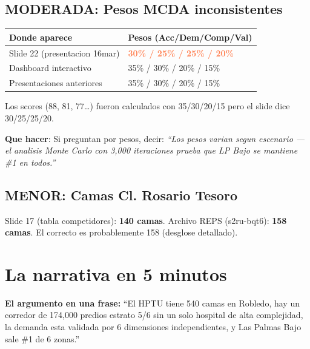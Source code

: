 \documentclass[11pt, a4paper]{article}
\newcommand{\dg}[1]{\textcolor{coral}{\textbf{#1}}}
\begin{document}
\subsection{MODERADA: Pesos MCDA inconsistentes}

\begin{aviso}
\begin{tabular}{@{}ll@{}}
\toprule
\textbf{Donde aparece} & \textbf{Pesos (Acc/Dem/Comp/Val)} \\
\midrule
Slide 22 (presentacion 16mar) & \dg{30\% / 25\% / 25\% / 20\%} \\
Dashboard interactivo & 35\% / 30\% / 20\% / 15\% \\
Presentaciones anteriores & 35\% / 30\% / 20\% / 15\% \\
\bottomrule
\end{tabular}

\vspace{4pt}
Los scores (88, 81, 77\ldots) fueron calculados con 35/30/20/15 pero el slide dice 30/25/25/20.

\vspace{2pt}
\textbf{Que hacer}: Si preguntan por pesos, decir: \textit{``Los pesos varian segun escenario --- el analisis Monte Carlo con 3,000 iteraciones prueba que LP Bajo se mantiene \#1 en todos.''}
\end{aviso}

\subsection{MENOR: Camas Cl. Rosario Tesoro}

\begin{aviso}
Slide 17 (tabla competidores): \textbf{140 camas}. Archivo REPS (s2ru-bqt6): \textbf{158 camas}. El correcto es probablemente 158 (desglose detallado).
\end{aviso}


\section{La narrativa en 5 minutos}

\begin{cita}
\textbf{El argumento en una frase:} ``El HPTU tiene 540 camas en Robledo, hay un corredor de 174,000 predios estrato 5/6 sin un solo hospital de alta complejidad, la demanda esta validada por 6 dimensiones independientes, y Las Palmas Bajo sale \#1 de 6 zonas.''
\end{cita}
\end{document}
